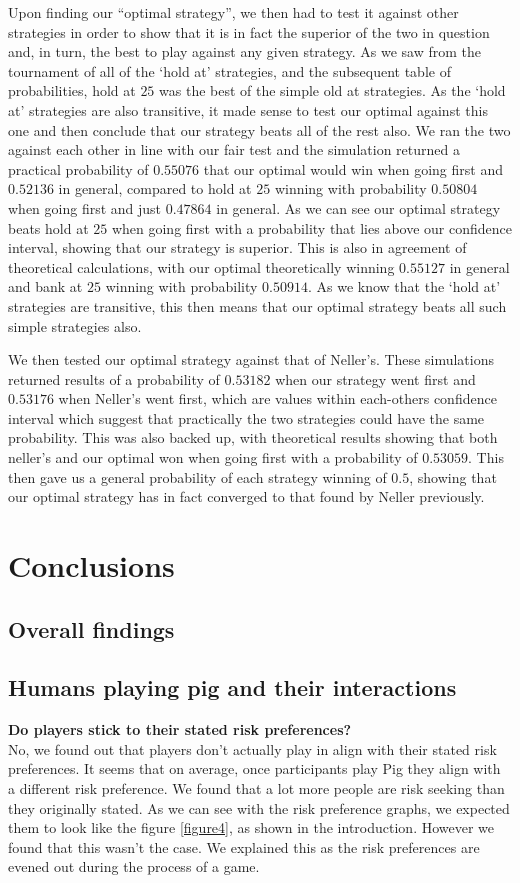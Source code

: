 \documentclass[a4paper,titlepage]{article}
\begin{document}
Upon finding our ``optimal strategy'', we then had to test it against other strategies in order to show that it is in fact the superior of the two in question and, in turn, the best to play against any given strategy. As we saw from the tournament of all of the ‘hold at’ strategies, and the subsequent table of probabilities, hold at $25$ was the best of the simple old at strategies. As the ‘hold at’ strategies are also transitive, it made sense to test our optimal against this one and then conclude that our strategy beats all of the rest also. We ran the two against each other in line with our fair test and the simulation returned a practical probability of $0.55076$ that our optimal would win when going first and $0.52136$ in general, compared to hold at $25$ winning with probability $0.50804$ when going first and just $0.47864$ in general. As we can see our optimal strategy beats hold at $25$ when going first with a probability that lies above our confidence interval, showing that our strategy is superior. This is also in agreement of theoretical calculations, with our optimal theoretically winning $0.55127$ in general and bank at $25$ winning with probability $0.50914$. As we know that the ‘hold at’ strategies are transitive, this then means that our optimal strategy beats all such simple strategies also.

We then tested our optimal strategy against that of Neller’s. These simulations returned results of a probability of $0.53182$ when our strategy went first and $0.53176$ when Neller’s went first, which are values within each-others confidence interval which suggest that practically the two strategies could have the same probability. This was also backed up, with theoretical results showing that both neller’s and our optimal won when going first with a probability of $0.53059$. This then gave us a general probability of each strategy winning of $0.5$, showing that our optimal strategy has in fact converged to that found by Neller previously.

\section{Conclusions}
\subsection{Overall findings}
\subsection{Humans playing pig and their interactions}
\textbf{Do players stick to their stated risk preferences?}\\No, we found out that players don’t actually play in align with their stated risk preferences. It seems that on average, once participants play Pig they align with a different risk preference. We found that a lot more people are risk seeking than they originally stated. As we can see with the risk preference graphs, we expected them to look like the figure \ref{figure4}, as shown in the introduction. However we found that this wasn’t the case. We explained this as the risk preferences are evened out during the process of a game.
\end{document}
